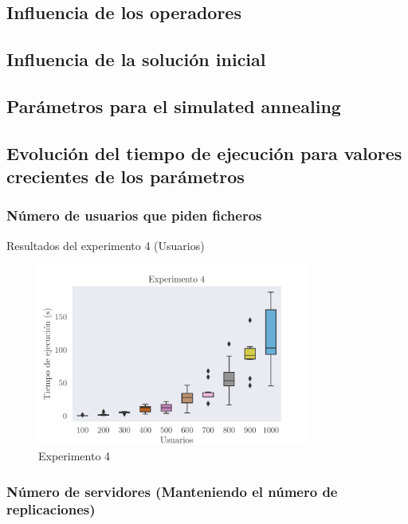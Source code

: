 \subsection{Influencia de los operadores}

\subsection{Influencia de la solución inicial}

\subsection{Parámetros para el simulated annealing}

\subsection{Evolución del tiempo de ejecución para valores crecientes de los parámetros}

\subsubsection{Número de usuarios que piden ficheros}

\begin{table}[H]
    \centering
    
    \caption{Resultados del experimento 4 (Usuarios)}%
    \label{tab:ex4u}
\end{table}

\begin{figure}[H]
\centering
\includegraphics[width=0.8\textwidth]{include/plots/ex4_u_time_bplot.pdf}
\caption{Experimento 4}%
\label{fig:ex4u}
\end{figure}

\subsubsection{Número de servidores (Manteniendo el número de replicaciones)}

